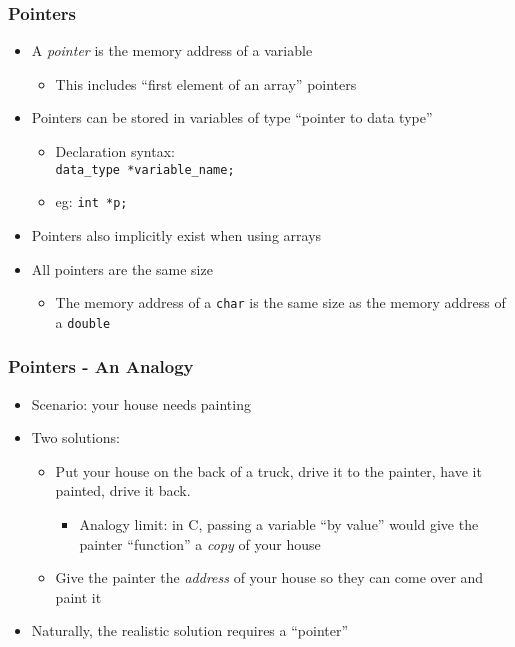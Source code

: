 \documentclass[14pt]{beamer}
\begin{document}
\begin{frame}
\frametitle{Pointers}
\begin{itemize}
\item A \textit{pointer} is the memory address of a variable
	\begin{itemize}
		\item This includes ``first element of an array'' pointers
	\end{itemize}
\item Pointers can be stored in variables of type ``pointer to data type''
	\begin{itemize}
		\item Declaration syntax:\\ \texttt{data\_type *variable\_name;}
		\item eg: \texttt{int *p;}
	\end{itemize}
\item Pointers also implicitly exist when using arrays
\item All pointers are the same size
	\begin{itemize}
		\item The memory address of a \texttt{char} is the same size as the memory address of a \texttt{double}
	\end{itemize}
\end{itemize}
\end{frame}

\begin{frame}
\frametitle{Pointers - An Analogy}
\begin{itemize}
\item Scenario: your house needs painting
\pause
\item Two solutions:
\pause
	\begin{itemize}
		\item Put your house on the back of a truck, drive it to the painter, have it painted, drive it back.
			\begin{itemize}
				\pause
				\item Analogy limit: in C, passing a variable ``by value'' would give the painter ``function'' a \textit{copy} of your house
			\end{itemize}
		\pause
		\item Give the painter the \textit{address} of your house so they can come over and paint it
	\end{itemize}
\pause
\item Naturally, the realistic solution requires a ``pointer''
\end{itemize}
\end{frame}
\end{document}
